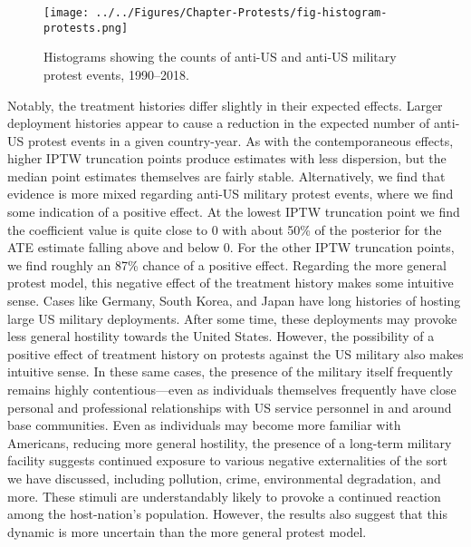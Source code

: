 			\begin{figure}[t]
				\centering\texttt{[image: ../../Figures/Chapter-Protests/fig-histogram-protests.png]}
				\caption{Histograms showing the counts of anti-US and anti-US military protest events, 1990--2018.}
				\label{fig:protesthistograms}
			\end{figure}
			
			
			Notably, the treatment histories differ slightly in their expected effects. Larger deployment histories appear to cause a reduction in the expected number of anti-US protest events in a given country-year. As with the contemporaneous effects, higher IPTW truncation points produce estimates with less dispersion, but the median point estimates themselves are fairly stable. Alternatively, we find that evidence is more mixed regarding anti-US military protest events, where we find some indication of a positive effect. At the lowest IPTW truncation point we find the coefficient value is quite close to 0 with about 50\% of the posterior for the ATE estimate falling above and below 0. For the other IPTW truncation points, we find roughly an 87\% chance of a positive effect.
			Regarding the more general protest model, this negative effect of the treatment history makes some intuitive sense. Cases like Germany, South Korea, and Japan have long histories of hosting large US military deployments. After some time, these deployments may provoke less general hostility towards the United States. However, the possibility of a positive effect of treatment history on protests against the US military also makes intuitive sense. In these same cases, the presence of the military itself frequently remains highly contentious---even as individuals themselves frequently have close personal and professional relationships with US service personnel in and around base communities. Even as individuals may become more familiar with Americans, reducing more general hostility, the presence of a long-term military facility suggests continued exposure to various negative externalities of the sort we have discussed, including pollution, crime, environmental degradation, and more. These stimuli are understandably likely to provoke a continued reaction among the host-nation's population. However, the results also suggest that this dynamic is more uncertain than the more general protest model.
			
			

